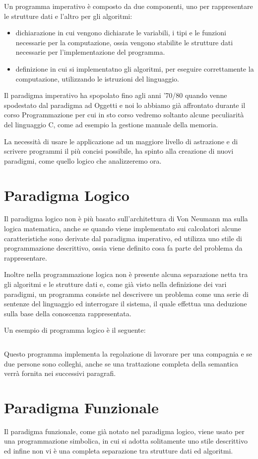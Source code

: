 \documentclass[a4paper]{book}
\begin{document}
Un programma imperativo è composto da due componenti, uno per rappresentare le strutture dati e l'altro per gli algoritmi:
\begin{itemize}
\item dichiarazione in cui vengono dichiarate le variabili, i tipi e le funzioni necessarie per la computazione,
      ossia vengono stabilite le strutture dati necessarie per l'implementazione del programma.
\item definizione in cui si implementatno gli algoritmi, per eseguire correttamente la computazione, utilizzando le istruzioni del linguaggio.
\end{itemize}
Il paradigma imperativo ha spopolato fino agli anni '70/80 quando venne spodestato dal paradigma ad Oggetti e noi lo abbiamo già
affrontato durante il corso Programmazione per cui in sto corso vedremo soltanto alcune peculiarità del linguaggio C,
come ad esempio la gestione manuale della memoria.

La necessità di usare le applicazione ad un maggiore livello di astrazione e di scrivere programmi il più concisi possibile, ha spinto
alla creazione di nuovi paradigmi, come quello logico che analizzeremo ora.

\section{Paradigma Logico}
Il paradigma logico non è più basato sull'architettura di Von Neumann ma sulla logica matematica, anche se quando viene implementato sui
calcolatori alcune caratteristiche sono derivate dal paradigma imperativo, ed utilizza uno stile di programmazione descrittivo,
ossia viene definito cosa fa parte del problema da rappresentare.

Inoltre nella programmazione logica non è presente alcuna separazione netta tra gli algoritmi e le strutture dati e, come già
visto nella definizione dei vari paradigmi, un programma consiste nel descrivere un problema come una serie di sentenze del linguaggio
ed interrogare il sistema, il quale effettua una deduzione sulla base della conoscenza rappresentata.

Un esempio di programma logico è il seguente:
\inputminted{prolog}{esempi/employees.pl}
Questo programma implementa la regolazione di lavorare per una compagnia e se due persone sono colleghi, anche se una trattazione
completa della semantica verrà fornita nei successivi paragrafi.
\section{Paradigma Funzionale}
Il paradigma funzionale, come già notato nel paradigma logico, viene usato per una programmazione simbolica,
in cui si adotta solitamente uno stile descrittivo ed infine non vi è una completa separazione tra strutture dati ed algoritmi.
\end{document}
